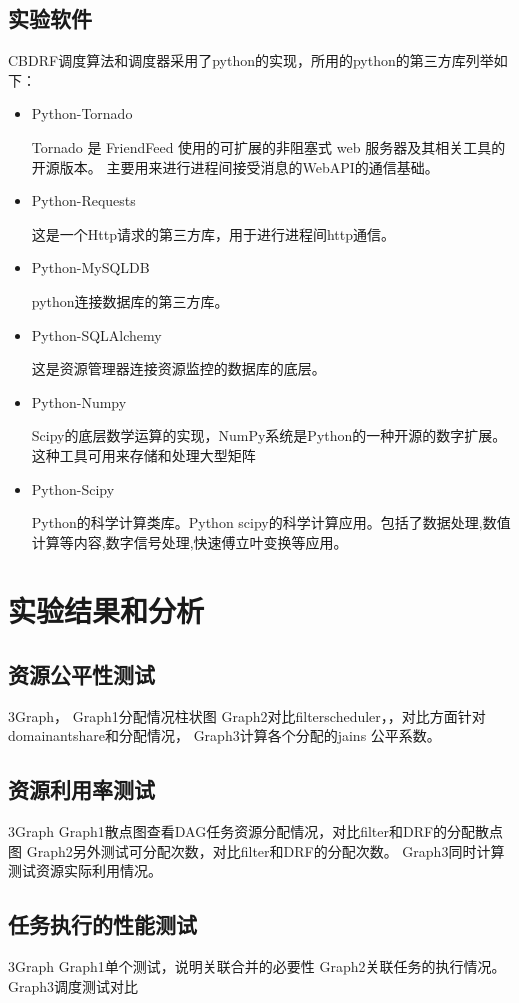 \subsection{实验软件}
CBDRF调度算法和调度器采用了python的实现，所用的python的第三方库列举如下：
\begin{itemize}
\item Python-Tornado 

Tornado 是 FriendFeed 使用的可扩展的非阻塞式 web 服务器及其相关工具的开源版本。
主要用来进行进程间接受消息的WebAPI的通信基础。
\item Python-Requests 

这是一个Http请求的第三方库，用于进行进程间http通信。
\item Python-MySQLDB  

python连接数据库的第三方库。
\item Python-SQLAlchemy 

这是资源管理器连接资源监控的数据库的底层。
\item Python-Numpy 

Scipy的底层数学运算的实现，NumPy系统是Python的一种开源的数字扩展。这种工具可用来存储和处理大型矩阵
\item Python-Scipy 

Python的科学计算类库。Python scipy的科学计算应用。包括了数据处理,数值计算等内容,数字信号处理,快速傅立叶变换等应用。
\end{itemize}


\section{实验结果和分析}
\subsection{资源公平性测试}
3Graph，
Graph1分配情况柱状图
Graph2对比filterscheduler，，对比方面针对domainantshare和分配情况，
Graph3计算各个分配的jains 公平系数。
\subsection{资源利用率测试}
3Graph 
Graph1散点图查看DAG任务资源分配情况，对比filter和DRF的分配散点图
Graph2另外测试可分配次数，对比filter和DRF的分配次数。
Graph3同时计算测试资源实际利用情况。

\subsection{任务执行的性能测试}
3Graph
Graph1单个测试，说明关联合并的必要性
Graph2关联任务的执行情况。
Graph3调度测试对比


